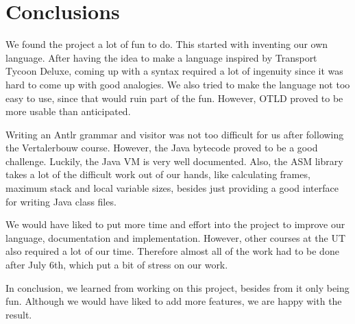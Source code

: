 \chapter{Conclusions}

We found the project a lot of fun to do.
This started with inventing our own language.
After having the idea to make a language inspired by Transport Tycoon Deluxe, coming up with a syntax required a lot of ingenuity since it was hard to come up with good analogies.
We also tried to make the language not too easy to use, since that would ruin part of the fun.
However, OTLD proved to be more usable than anticipated.

Writing an Antlr grammar and visitor was not too difficult for us after following the Vertalerbouw course.
However, the Java bytecode proved to be a good challenge.
Luckily, the Java VM is very well documented.
Also, the ASM library takes a lot of the difficult work out of our hands, like calculating frames, maximum stack and local variable sizes, besides just providing a good interface for writing Java class files.

We would have liked to put more time and effort into the project to improve our language, documentation and implementation.
However, other courses at the UT also required a lot of our time.
Therefore almost all of the work had to be done after July 6th, which put a bit of stress on our work.

In conclusion, we learned from working on this project, besides from it only being fun.
Although we would have liked to add more features, we are happy with the result.
